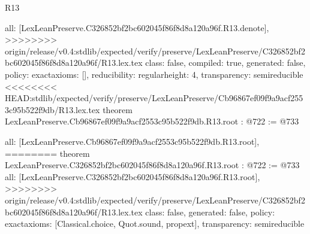 \begin{lexlean}{R13}
\begin{coremodule}
{{{{{{{{{  all: [LexLeanPreserve.C326852bf2bc602045f86f8d8a120a96f.R13.denote],
>>>>>>>> origin/release/v0.4:stdlib/expected/verify/preserve/LexLeanPreserve/C326852bf2bc602045f86f8d8a120a96f/R13.lex.tex
  class: false,
  compiled: true,
  generated: false,
  policy: exact{axioms: []},
  reducibility: regular{height: 4},
  transparency: semireducible
}
<<<<<<<< HEAD:stdlib/expected/verify/preserve/LexLeanPreserve/Cb96867ef09f9a9acf2553c95b522f9db/R13.lex.tex
theorem LexLeanPreserve.Cb96867ef09f9a9acf2553c95b522f9db.R13.root : @722 := @733 {
  all: [LexLeanPreserve.Cb96867ef09f9a9acf2553c95b522f9db.R13.root],
========
theorem LexLeanPreserve.C326852bf2bc602045f86f8d8a120a96f.R13.root : @722 := @733 {
  all: [LexLeanPreserve.C326852bf2bc602045f86f8d8a120a96f.R13.root],
>>>>>>>> origin/release/v0.4:stdlib/expected/verify/preserve/LexLeanPreserve/C326852bf2bc602045f86f8d8a120a96f/R13.lex.tex
  class: false,
  generated: false,
  policy: exact{axioms: [Classical.choice, Quot.sound, propext]},
  transparency: semireducible
}

}}}}}}}}}
\end{coremodule}
\end{lexlean}
